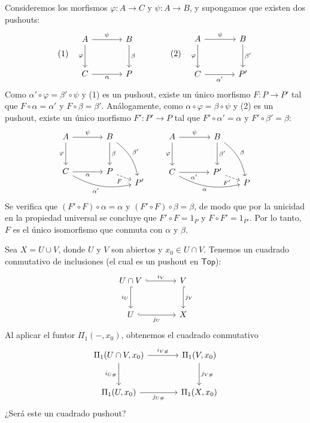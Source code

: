 \begin{dem}
Consideremos los morfismos $\varphi \colon A \to C$ y $\psi \colon A \to B$, y supongamos que existen dos pushouts:
\[
\text{(1)} \quad
\begin{tikzcd}[row sep=large, column sep=large]
A \arrow[r, "\psi"] \arrow[d, "\varphi"'] & B \arrow[d, "\beta"] \\
C \arrow[r, "\alpha"'] & P
\end{tikzcd}
\qquad \qquad
\text{(2)} \quad
\begin{tikzcd}[row sep=large, column sep=large]
A \arrow[r, "\psi"] \arrow[d, "\varphi"'] & B \arrow[d, "\beta'"] \\
C \arrow[r, "\alpha'"'] & P'
\end{tikzcd}
\]
Como $\alpha' \circ \varphi = \beta' \circ \psi$ y (1) es un pushout, existe un único morfismo $F \colon P \to P'$ tal que $F \circ \alpha = \alpha'$ y $F \circ \beta = \beta'$. Análogamente, como $\alpha \circ \varphi = \beta \circ \psi$ y (2) es un pushout, existe un único morfismo $F' \colon P' \to P$ tal que $F' \circ \alpha' = \alpha$ y $F' \circ \beta' = \beta$:
\[
\begin{tikzcd}[row sep=large, column sep=large]
A \arrow[r, "\psi"] \arrow[d, "\varphi"'] & B \arrow[d, "\beta"] \arrow[ddr, "\beta'", bend left=20] &[-0.65cm] \\
C \arrow[r, "\alpha"'] \arrow[rrd, "\alpha'"', bend right=20] & P \arrow[dr, "F"', dashed] & \\[-1cm]
& & P'
\end{tikzcd}
\qquad
\begin{tikzcd}[row sep=large, column sep=large]
A \arrow[r, "\psi"] \arrow[d, "\varphi"'] & B \arrow[d, "\beta'"] \arrow[ddr, "\beta", bend left=20] &[-0.65cm] \\
C \arrow[r, "\alpha'"'] \arrow[rrd, "\alpha"', bend right=20] & P' \arrow[dr, "F'"', dashed] & \\[-1cm]
& & P
\end{tikzcd}
\]
Se verifica que $(F' \circ F) \circ \alpha = \alpha$ y $(F' \circ F) \circ \beta = \beta$, de modo que por la unicidad en la propiedad universal se concluye que $F' \circ F = 1_P$ y $F \circ F' = 1_{P'}$. Por lo tanto, $F$ es el único isomorfismo que conmuta con $\alpha$ y $\beta$.
\end{dem}

Sea $X = U \cup V$, donde $U$ y $V$ son abiertos y $x_0 \in U \cap V$. Tenemos un cuadrado conmutativo de inclusiones (el cual es un pushout en $\mathsf{Top}$):
\[
\begin{tikzcd}[row sep=large, column sep=large]
U \cap V \arrow[r, "i_V", hook] \arrow[d, "i_U"', hook] & V \arrow[d, "j_V", hook] \\
U \arrow[r, "j_U"', hook] & X
\end{tikzcd}
\]
Al aplicar el funtor $\Pi_1(-, x_0)$, obtenemos el cuadrado conmutativo
\[
\begin{tikzcd}[row sep=large, column sep=large]
\Pi_1(U \cap V, x_0) \arrow[r, "i_{V\#}"] \arrow[d, "i_{U\#}"'] & \Pi_1(V, x_0) \arrow[d, "j_{V\#}"] \\
\Pi_1(U, x_0) \arrow[r, "j_{U\#}"'] & \Pi_1(X, x_0)
\end{tikzcd}
\]
¿Será este un cuadrado pushout?

